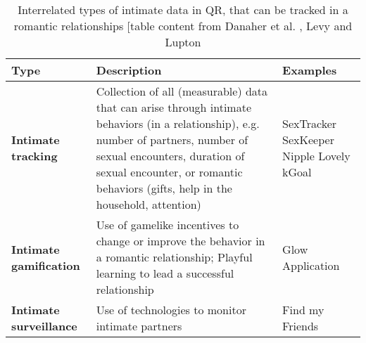 \begin{table*}[t]
	\caption{Interrelated types of intimate data in \acl{QR}, that can be tracked in a romantic relationships [table content from Danaher et al.  \cite{doi:10.1080/15265161.2017.1409823}, Levy \cite{levy2014intimate} and Lupton \cite{doi:10.1080/13691058.2014.920528}}
	\label{tab:typ_of_QR}
	\scriptsize
	\begin{center}
		\begin{tabular}{|p{4cm}|p{11cm}|p{2cm}|}
			\hline
			Type & Description & Examples \\
			\hline
			\hline
			\textbf{Intimate tracking} &  Collection of all (measurable) data that can arise through intimate behaviors (in a relationship), e.g. number of partners, number of sexual encounters, duration of sexual encounter, or romantic behaviors (gifts, help in the household, attention) & SexTracker \newline SexKeeper \newline Nipple \newline Lovely \newline kGoal \\
			\hline
			\textbf{Intimate gamification} & Use of gamelike incentives to change or improve the behavior in a romantic relationship; Playful learning to lead a successful relationship & Glow Application \\
			\hline
			\textbf{Intimate surveillance} & Use of technologies to monitor intimate partners & Find my Friends \\
			\hline
		\end{tabular}
	\end{center}
\end{table*}